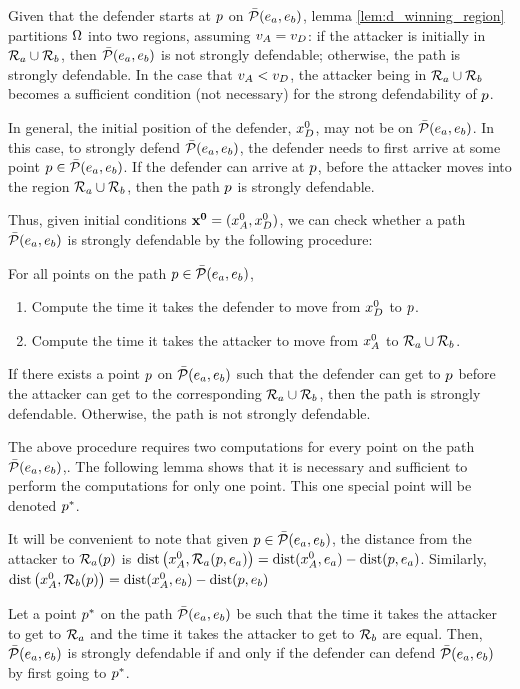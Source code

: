 Given that the defender starts at $p$ on $\bar{\mathcal{P}}(e_a,e_b)$, lemma \ref{lem:d_winning_region} partitions $\Omega$ into two regions, assuming $v_A=v_D$: if the attacker is initially in $\mathcal{R}_a \cup \mathcal{R}_b$, then $\bar{\mathcal{P}}(e_a,e_b)$ is not strongly defendable; otherwise, the path is strongly defendable. In the case that $v_A<v_D$, the attacker being in $\mathcal{R}_a \cup \mathcal{R}_b$ becomes a sufficient condition (not necessary) for the strong defendability of $p$.

In general, the initial position of the defender, $x_D^0$, may not be on $\bar{\mathcal{P}}(e_a,e_b)$. In this case, to strongly defend $\bar{\mathcal{P}}(e_a,e_b)$, the defender needs to first arrive at some point $p\in\bar{\mathcal{P}}(e_a,e_b)$. If the defender can arrive at $p$, before the attacker moves into the region $\mathcal{R}_a\cup\mathcal{R}_b$, then the path $p$ is strongly defendable. 

Thus, given initial conditions $\mathbf{x^0} = (x_A^0,x_D^0)$, we can check whether a path $\bar{\mathcal{P}}(e_a,e_b)$ is strongly defendable by the following procedure:

For all points on the path $p\in\bar{\mathcal{P}}(e_a,e_b)$,
\begin{enumerate}
\item Compute the time it takes the defender to move from $x_D^0$ to $p$.
\item Compute the time it takes the attacker to move from $x_A^0$ to $\mathcal{R}_a\cup\mathcal{R}_b$.
\end{enumerate}
If there exists a point $p$ on $\bar{\mathcal{P}}(e_a,e_b)$ such that the defender can get to $p$ before the attacker can get to the corresponding $\mathcal{R}_a\cup\mathcal{R}_b$, then the path is strongly defendable. Otherwise, the path is not strongly defendable.

The above procedure requires two computations for every point on the path $\bar{\mathcal{P}}(e_a,e_b)$,. The following lemma shows that it is necessary and sufficient to perform the computations for only one point. This one special point will be denoted $p^*$.

\begin{rem} \label{rem:time_to_region_a}
It will be convenient to note that given $p\in\bar{\mathcal{P}}(e_a,e_b)$, the distance from the attacker to $\mathcal{R}_a(p)$ is $\text{dist}\left(x_A^0,\mathcal{R}_a(p,e_a)\right) = \text{dist}(x_A^0,e_a) - \text{dist}(p,e_a)$. Similarly, $\text{dist}\left(x_A^0,\mathcal{R}_b(p)\right) = \text{dist}(x_A^0,e_b) - \text{dist}(p,e_b)$
\end{rem}

\begin{lem} \label{lem:pstar}
Let a point $p^*$ on the path $\bar{\mathcal{P}}(e_a,e_b)$ be such that the time it takes the attacker to get to $\mathcal{R}_a$ and the time it takes the attacker to get to $\mathcal{R}_b$ are equal. Then, $\bar{\mathcal{P}}(e_a,e_b)$ is strongly defendable if and only if the defender can defend $\bar{\mathcal{P}}(e_a,e_b)$ by first going to $p^*$.
\end{lem}

